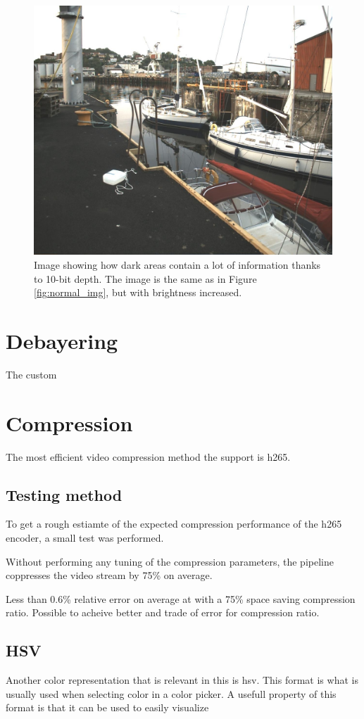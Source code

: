 \begin{figure}[H]
    \centering
    \includegraphics[width=.8\textwidth]{figures/pictures/gained_right_96.jpeg}
    \caption{Image showing how dark areas contain a lot of information thanks to 10-bit depth.
        The image is the same as in Figure \ref{fig:normal_img}, but with brightness increased.}
    \label{fig:gained_image}
\end{figure}
\section{Debayering}
The custom



\section{Compression}



The most efficient video compression method the \jx support is \gls{h265}.

\subsection{Testing method}
To get a rough estiamte of the expected compression performance of the \gls{h265} encoder, a small test was performed.






Without performing any tuning of the compression parameters, the pipeline coppresses the video stream by 75\% on average.


Less than 0.6\% relative error on average at with a 75\% space saving compression ratio.
Possible to acheive better and trade of error for compression ratio.

\subsection{HSV}
Another color representation that is relevant in this \master is \gls{hsv}.
This format is what is usually used when selecting color in a color picker.
A usefull property of this format is that it can be used to easily visualize